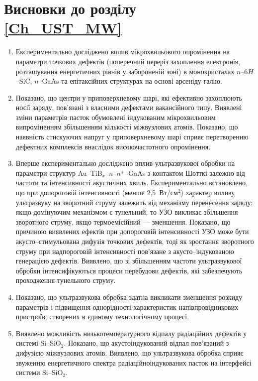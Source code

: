 \section*{Висновки до розділу \ref{Ch_UST_MW}}
  \begin{enumerate}[leftmargin=0cm,itemindent=3em]
\item Експериментально досліджено вплив мікрохвильового опромінення на параметри точкових дефектів (поперечний переріз захоплення електронів,
розташування енергетичних рівнів у забороненій зоні) в монокристалах $n$--6$H$--SiC, $n$--GaAs та епітаксійних структурах на основі арсеніду галію.


\item Показано, що  центри у приповерхневому шарі, які ефективно захоплюють носії заряду, пов'язані з власними дефектами вакансійного типу.
Виявлені зміни параметрів пасток обумовлені індукованим мікрохвильовим випроміненням
збільшенням кількості міжвузлових атомів.
Показано, що наявність стискуючих напруг у приповерхневому шарі сприяє перетворенню дефектних комплексів внаслідок високочастотного опромінення.

     \item Вперше експериментально досліджено вплив ультразвукової обробки на параметри структур Au--TiB$_x$--$n$--$n^+$--GaAs з контактом Шотткі залежно від частоти та інтенсивності акустичних хвиль.
 Експериментально встановлено, що при допороговій інтенсивності (менше 2,5~Вт/см$^2$) характер впливу ультразвуку на зворотний струму залежить від механізму перенесення заряду:
  якщо домінуючим механізмом є тунельний, то УЗО викликає збільшення зворотного струму, якщо термоемісійний --- зменшення.
  Показано, що причиною  виявлених ефектів при допороговій інтенсивності УЗО
  може бути акусто--стимульована дифузія точкових дефектів, тоді як зростання зворотного струму при надпороговій  інтенсивності пов'язане з акусто--індукованою генерацією дефектів.
 Виявлено, що зі збільшенням частоти ультразвукової обробки інтенсифікуються процеси перебудови дефектів, які забезпечують проходження тунельного струму.

\item Показано, що ультразвукова обробка здатна викликати зменшення розкиду параметрів і підвищення однорідності характеристик напівпровідникових пристроїв, створених в єдиному технологічному процесі.

\item %
   Виявлено можливість низькотемпературного відпалу радіаційних дефектів у системі Si--SiO$_2$.
   Показано, що акустоіндукований відпал пов'язаний з дифузією міжвузлових атомів.
 Виявлено, що ультразвукова обробка сприяє звуженню енергетичного спектра радіаційноіндукованих пасток
на інтерфейсі системи    Si--SiO$_2$.


\end{enumerate}	



